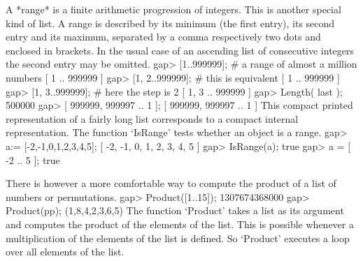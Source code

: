 A *range* is a finite arithmetic progression of integers. This is another
special kind   of list. A range  is  described by its minimum  (the first
entry), its second entry and its maximum, separated  by a comma respectively
two dots and enclosed in brackets. In the usual case of an ascending list of
consecutive integers the second entry may be omitted.
\beginexample
    gap> [1..999999];     #  a range of almost a million numbers
    [ 1 .. 999999 ]
    gap> [1, 2..999999];  #  this is equivalent
    [ 1 .. 999999 ]
    gap> [1, 3..999999];  #  here the step is 2
    [ 1, 3 .. 999999 ]
    gap> Length( last );
    500000
    gap> [ 999999, 999997 .. 1 ];
    [ 999999, 999997 .. 1 ]
\endexample
This compact printed representation of a fairly long  list corresponds to
a  compact internal representation.  The function `IsRange' tests whether
an object is a range.
\beginexample
    gap> a:= [-2,-1,0,1,2,3,4,5];
    [ -2, -1, 0, 1, 2, 3, 4, 5 ]
    gap> IsRange(a);
    true
    gap> a = [ -2 .. 5 ];
    true
\endexample



There is however a more comfortable way to  compute the product of a list
of numbers or permutations.
\beginexample
    gap> Product([1..15]);
    1307674368000
    gap> Product(pp);
    (1,8,4,2,3,6,5) 
\endexample
The function  `Product'  takes a  list as  its argument and computes  the
product  of  the  elements  of the  list.   This  is possible whenever  a
multiplication of  the elements of the list is defined.  So  `Product' 
executes a loop over all elements of the list.

